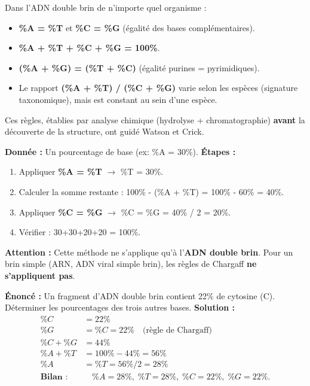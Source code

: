 \documentclass[11pt]{article}
\begin{document}
\begin{propriete}
Dans l'ADN double brin de n'importe quel organisme :
\begin{itemize}
    \item \textbf{\%A = \%T} et \textbf{\%C = \%G} (égalité des bases complémentaires).
    \item \textbf{\%A + \%T + \%C + \%G = 100\%}.
    \item \textbf{(\%A + \%G) = (\%T + \%C)} (égalité purines = pyrimidiques).
    \item Le rapport \textbf{(\%A + \%T) / (\%C + \%G)} varie selon les espèces (signature taxonomique), mais est constant au sein d'une espèce.
\end{itemize}
Ces règles, établies par analyse chimique (hydrolyse + chromatographie) \textbf{avant} la découverte de la structure, ont guidé Watson et Crick.
\end{propriete}

\begin{methode}
\textbf{Donnée :} Un pourcentage de base (ex: \%A = 30\%).
\textbf{Étapes :}
\begin{enumerate}
    \item Appliquer \textbf{\%A = \%T} $\rightarrow$ \%T = 30\%.
    \item Calculer la somme restante : 100\% - (\%A + \%T) = 100\% - 60\% = 40\%.
    \item Appliquer \textbf{\%C = \%G} $\rightarrow$ \%C = \%G = 40\% / 2 = 20\%.
    \item Vérifier : 30+30+20+20 = 100\%.
\end{enumerate}
\textbf{Attention :} Cette méthode ne s'applique qu'à l'\textbf{ADN double brin}. Pour un brin simple (ARN, ADN viral simple brin), les règles de Chargaff \textbf{ne s'appliquent pas}.
\end{methode}

\begin{exoresolu}
\textbf{Énoncé :} Un fragment d'ADN double brin contient 22\% de cytosine (C). Déterminer les pourcentages des trois autres bases.
\textbf{Solution :}
\begin{align*}
    \%C &= 22\% \\
    \%G &= \%C = 22\% \quad \text{(règle de Chargaff)} \\
    \%C + \%G &= 44\% \\
    \%A + \%T &= 100\% - 44\% = 56\% \\
    \%A &= \%T = 56\% / 2 = 28\% \\
    \textbf{Bilan :} &\quad \%A = 28\%,\; \%T = 28\%,\; \%C = 22\%,\; \%G = 22\%.
\end{align*}
\end{exoresolu}
\end{document}
